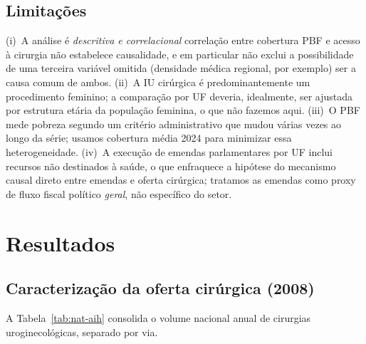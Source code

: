 \documentclass[12pt,a4paper,oneside]{article}
\begin{document}
\subsection{Limitações}

(i)~A análise é \textit{descritiva e correlacional} \textemdash{}
correlação entre cobertura PBF e acesso à cirurgia não estabelece
causalidade, e em particular não exclui a possibilidade de uma
terceira variável omitida (densidade médica regional, por
exemplo) ser a causa comum de ambos. (ii)~A IU cirúrgica é
predominantemente um procedimento feminino; a comparação por UF
deveria, idealmente, ser ajustada por estrutura etária da
população feminina, o que não fazemos aqui. (iii)~O PBF mede
pobreza segundo um critério administrativo que mudou várias
vezes ao longo da série; usamos cobertura média 2024
para minimizar essa heterogeneidade. (iv)~A execução de emendas
parlamentares por UF inclui recursos não destinados à saúde, o
que enfraquece a hipótese do mecanismo causal direto entre
emendas e oferta cirúrgica; tratamos as emendas como proxy de
fluxo fiscal político \textit{geral}, não específico do setor.

\section{Resultados}\label{sec:resultados}

\subsection{Caracterização da oferta cirúrgica
(2008)}\label{sub:oferta}

A Tabela~\ref{tab:nat-aih} consolida o volume nacional anual de
cirurgias uroginecológicas, separado por via.
\end{document}

